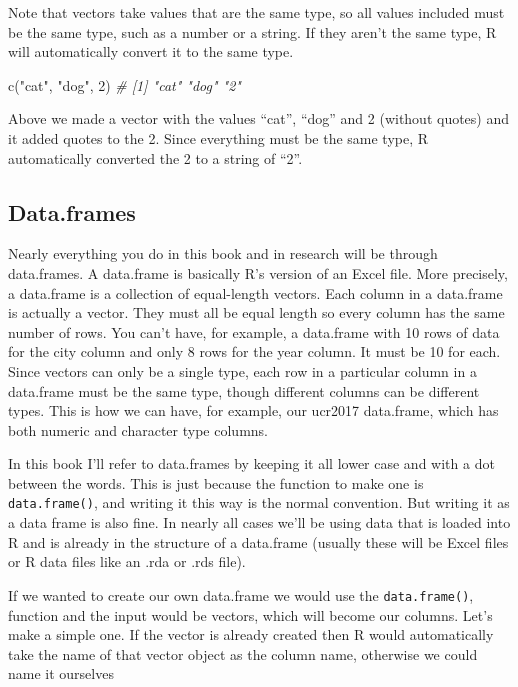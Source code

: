 \documentclass[
]{krantz}
\makeatletter
\newenvironment{Shaded}{\begin{snugshade}}{\end{snugshade}}
\newcommand{\CommentTok}[1]{\textcolor[rgb]{0.37,0.37,0.37}{\textit{#1}}}
\newcommand{\DecValTok}[1]{\textcolor[rgb]{0.06,0.06,0.06}{#1}}
\newcommand{\FunctionTok}[1]{\textcolor[rgb]{0,0,0}{#1}}
\newcommand{\NormalTok}[1]{#1}
\newcommand{\StringTok}[1]{\textcolor[rgb]{0.5,0.5,0.5}{#1}}
\newenvironment{kframe}{%
\medskip{}
\setlength{\fboxsep}{.8em}
 \def\at@end@of@kframe{}%
 \ifinner\ifhmode%
  \def\at@end@of@kframe{\end{minipage}}%
  \begin{minipage}{\columnwidth}%
 \fi\fi%
 \def\FrameCommand##1{\hskip\@totalleftmargin \hskip-\fboxsep
 \colorbox{shadecolor}{##1}\hskip-\fboxsep
     \hskip-\linewidth \hskip-\@totalleftmargin \hskip\columnwidth}%
 \MakeFramed {\advance\hsize-\width
   \@totalleftmargin\z@ \linewidth\hsize
   \@setminipage}}%
 {\par\unskip\endMakeFramed%
 \at@end@of@kframe}
\renewenvironment{Shaded}{\begin{kframe}}{\end{kframe}}
\makeatother
\begin{document}
Note that vectors take values that are the same type, so all
values included must be the same type, such as a number or a
string. If they aren't the same type, R will automatically
convert it to the same type.

\begin{Shaded}
\begin{Highlighting}[]
\FunctionTok{c}\NormalTok{(}\StringTok{"cat"}\NormalTok{, }\StringTok{"dog"}\NormalTok{, }\DecValTok{2}\NormalTok{)}
\CommentTok{\# [1] "cat" "dog" "2"}
\end{Highlighting}
\end{Shaded}

Above we made a vector with the values ``cat'', ``dog'' and
2 (without quotes) and it added quotes to the 2. Since
everything must be the same type, R automatically converted
the 2 to a string of ``2''.

\hypertarget{dataframes}{%
\subsection{Data.frames}\label{dataframes}}

Nearly everything you do in this book and in research will
be through data.frames. A data.frame is basically R's
version of an Excel file. More precisely, a data.frame is a
collection of equal-length vectors. Each column in a
data.frame is actually a vector. They must all be equal
length so every column has the same number of rows. You
can't have, for example, a data.frame with 10 rows of data
for the city column and only 8 rows for the year column. It
must be 10 for each. Since vectors can only be a single
type, each row in a particular column in a data.frame must
be the same type, though different columns can be different
types. This is how we can have, for example, our ucr2017
data.frame, which has both numeric and character type
columns.

In this book I'll refer to data.frames by keeping it all
lower case and with a dot between the words. This is just
because the function to make one is \texttt{data.frame()},
and writing it this way is the normal convention. But
writing it as a data frame is also fine. In nearly all cases
we'll be using data that is loaded into R and is already in
the structure of a data.frame (usually these will be Excel
files or R data files like an .rda or .rds file).

If we wanted to create our own data.frame we would use the
\texttt{data.frame()}, function and the input would be
vectors, which will become our columns. Let's make a simple
one. If the vector is already created then R would
automatically take the name of that vector object as the
column name, otherwise we could name it ourselves
\end{document}
